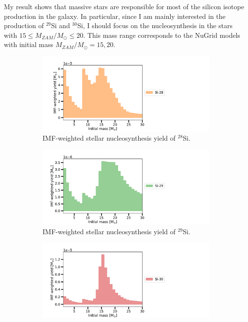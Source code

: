 \documentclass{brandeis-thesis3.2}
\def \msun {M_{\odot}}
\newcommand{\iso}[2]{$^{#1}${#2}}
\begin{document}
My result shows that massive stars are responsible for most of the silicon isotope production in the galaxy. In particular, since I am mainly interested in the production of \iso{29}{Si} and \iso{30}{Si}, I should focus on the nucleosynthesis in the stars with $15 \leq M_{ZAM}/\msun \leq 20$. This mass range corresponds to the NuGrid models with initial mass $M_{ZAM}/\msun = 15, 20$.
\begin{figure}[H]
    \begin{subfigure}[c]{0.6\textwidth}
        \includegraphics[width=\textwidth]{figs/Si-28_Z=0.02_yield.pdf}
        \caption{IMF-weighted stellar nucleosynthesis yield of \iso{28}{Si}.}
    \end{subfigure}
    \begin{subfigure}[c]{0.6\textwidth}
        \includegraphics[width=\textwidth]{figs/Si-29_Z=0.02_yield.pdf}
        \caption{IMF-weighted stellar nucleosynthesis yield of \iso{29}{Si}.}
    \end{subfigure}
    \centering
    \begin{subfigure}[c]{0.6\textwidth}
        \includegraphics[width=\textwidth]{figs/Si-30_Z=0.02_yield.pdf}

\end{subfigure}
\end{figure}
\end{document}
